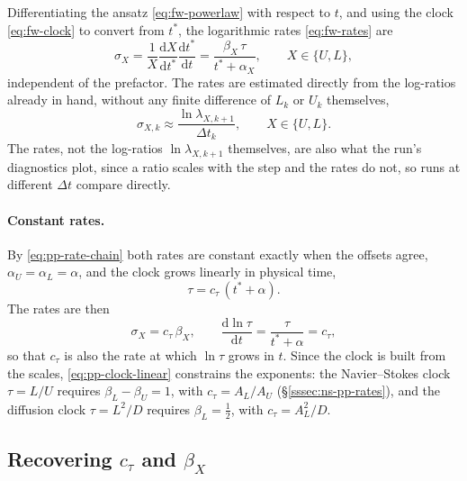 \documentclass{article}
\begin{document}
Differentiating the ansatz \eqref{eq:fw-powerlaw} with respect to $t$, and
using the clock \eqref{eq:fw-clock} to convert from $t^*$, the logarithmic
rates \eqref{eq:fw-rates} are
\begin{equation}\label{eq:pp-rate-chain}
  \sigma_X = \frac{1}{X}\frac{\mathrm{d} X}{\mathrm{d} t^*}\frac{\mathrm{d} t^*}{\mathrm{d} t}
  = \frac{\beta_X\, \tau}{t^* + \alpha_X},
  \qquad X \in \{U, L\},
\end{equation}
independent of the prefactor. The rates are estimated directly from the
log-ratios already in hand, without any finite difference of $L_k$ or $U_k$
themselves,
\begin{equation}\label{eq:pp-rate-fd}
  \sigma_{X,k} \approx \frac{\ln \lambda_{X,k+1}}{\Delta t_k},
  \qquad X \in \{U, L\}.
\end{equation}
The rates, not the log-ratios $\ln \lambda_{X,k+1}$ themselves, are also
what the run's diagnostics plot, since a ratio scales with the step and the
rates do not, so runs at different $\Delta t$ compare directly.

\paragraph{Constant rates.}
By \eqref{eq:pp-rate-chain} both rates are constant exactly when the offsets
agree, $\alpha_U = \alpha_L = \alpha$, and the clock grows linearly in
physical time,
\begin{equation}\label{eq:pp-clock-linear}
  \tau = c_\tau\, (t^* + \alpha).
\end{equation}
The rates are then
\begin{equation}\label{eq:pp-rates-const}
  \sigma_X = c_\tau\, \beta_X ,
  \qquad
  \frac{\mathrm{d} \ln \tau}{\mathrm{d} t} = \frac{\tau}{t^* + \alpha} = c_\tau ,
\end{equation}
so that $c_\tau$ is also the rate at which $\ln \tau$ grows in $t$. Since the
clock is built from the scales, \eqref{eq:pp-clock-linear} constrains the
exponents: the Navier--Stokes clock $\tau = L/U$ requires
$\beta_L - \beta_U = 1$, with $c_\tau = A_L/A_U$ (\S\ref{sssec:ns-pp-rates}),
and the diffusion clock $\tau = L^2/D$ requires $\beta_L = \tfrac12$, with
$c_\tau = A_L^2/D$.

\subsection{Recovering \texorpdfstring{$c_\tau$ and $\beta_X$}{c\_tau and beta\_X}}\label{ssec:pp-lines}
\end{document}
